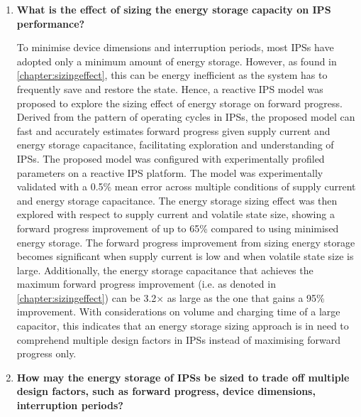 \begin{enumerate}

\item \textbf{What is the effect of sizing the energy storage capacity on IPS performance?}

To minimise device dimensions and interruption periods, most IPSs have adopted only a minimum amount of energy storage. 
However, as found in \cref{chapter:sizingeffect}, this can be energy inefficient as the system has to frequently save and restore the state. 
Hence, a reactive IPS model was proposed to explore the sizing effect of energy storage on forward progress. 
Derived from the pattern of operating cycles in IPSs, the proposed model can fast and accurately estimates forward progress given supply current and energy storage capacitance, facilitating exploration and understanding of IPSs. 
The proposed model was configured with experimentally profiled parameters on a reactive IPS platform.
The model was experimentally validated with a 0.5\% mean error across multiple conditions of supply current and energy storage capacitance. 
The energy storage sizing effect was then explored with respect to supply current and volatile state size, showing a forward progress improvement of up to 65\% compared to using minimised energy storage.
The forward progress improvement from sizing energy storage becomes significant when supply current is low and when volatile state size is large. 
Additionally, the energy storage capacitance that achieves the maximum forward progress improvement (i.e.  as denoted in \cref{chapter:sizingeffect}) can be 3.2$\times$ as large as the one that gains a 95\% improvement. 
With considerations on volume and charging time of a large capacitor, this indicates that an energy storage sizing approach is in need to comprehend multiple design factors in IPSs instead of maximising forward progress only.

\item \textbf{How may the energy storage of IPSs be sized to trade off multiple design factors, such as forward progress, device dimensions, interruption periods?}


\end{enumerate}
